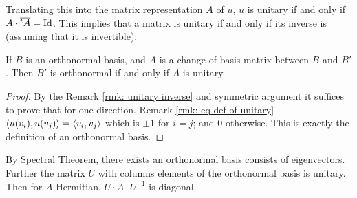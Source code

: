 \begin{remark}\label{rmk: unitary inverse}
    Translating this into the matrix representation $A$ of $u$, $u$ is unitary if and only if $A \cdot \overline{^t A} = \mathrm{Id}$. This implies that a matrix is unitary if and only if its inverse is (assuming that it is invertible). 
\end{remark}

\begin{proposition}
    If $B$ is an orthonormal basis, and $A$ is a change of basis matrix between $B$ and $B'$. Then $B'$ is orthonormal if and only if $A$ is unitary.
\end{proposition}

\begin{proof}
    By the Remark \ref{rmk: unitary inverse} and symmetric argument it suffices to prove that for one direction. Remark \ref{rmk: eq def of unitary} $\left\langle u(v_i), u(v_j) \right\rangle = \left\langle v_i, v_j \right\rangle$ which is $\pm 1$ for $i = j$; and 0 otherwise. This is exactly the definition of an orthonormal basis. 
\end{proof}

\begin{remark}
    By Spectral Theorem, there exists an orthonormal basis consists of eigenvectors. Further the matrix $U$ with columns elements of the orthonormal basis is unitary. Then for $A$ Hermitian, $U \cdot A \cdot U^{-1}$ is diagonal. 
\end{remark}